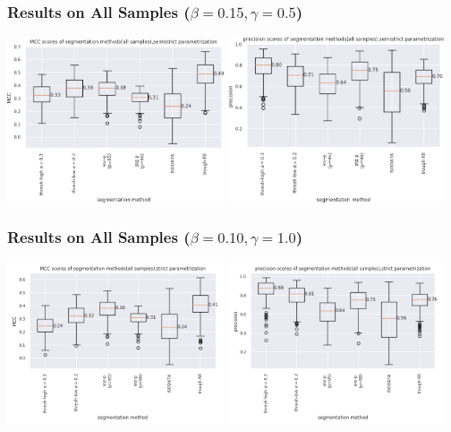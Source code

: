 \documentclass[9pt]{beamer}
\begin{document}
\begin{frame}
\frametitle{Results on All Samples ($\beta=0.15, \gamma=0.5$)}
\begin{center}
\includegraphics[width=0.48\textwidth]{190326-all-MCC-boxplot-semistrict}
\includegraphics[width=0.48\textwidth]{190326-all-precision-boxplot-semistrict}
\end{center}
\end{frame}

\begin{frame}
\frametitle{Results on All Samples ($\beta=0.10, \gamma=1.0$)}
\begin{center}
  \includegraphics[width=0.48\textwidth]{all-MCC-boxplot-strict}
  \includegraphics[width=0.48\textwidth]{all-precision-boxplot-strict}
\end{center}
\end{frame}
\end{document}
